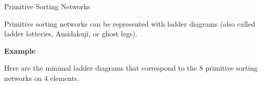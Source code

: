 \documentclass[10pt, compress,aspectratio=169,handout]{beamer}
\begin{document}
\begin{frame}{Primitive Sorting Networks}\pause

\vspace{1em}

Primitive sorting networks can be represented with \alert{ladder diagrams} (also called \alert{ladder lotteries}, \alert{Amidakuji}, or \alert{ghost legs}).

\pause

\begin{block}{\textbf{Example}}

\vspace{-.5em}

Here are the minimal ladder diagrams that correspond to the 8 primitive sorting networks on 4 elements.

\vspace{-.5em}


\end{block}
\end{frame}
\end{document}
